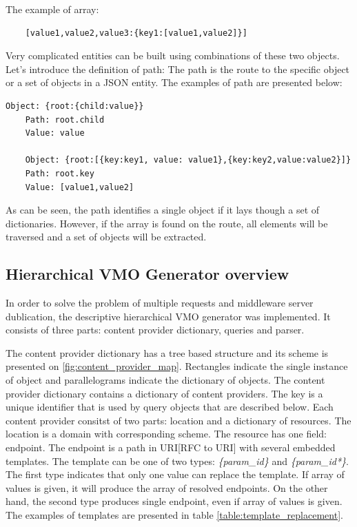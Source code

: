  
The example of array: 

\lstset{ %
    caption=The example of JSON array,
    basicstyle=\ttfamily\footnotesize\bfseries,
    linewidth=0.6\textwidth
 }
\begin{lstlisting}
	[value1,value2,value3:{key1:[value1,value2]}]
\end{lstlisting}

Very complicated entities can be built using combinations of these two objects. Let's introduce the definition of path: The path is the route to the specific object or a set of objects in a JSON entity. 
The examples of path are presented below:
\lstset{ %
    caption=The examples of objects in different routes,
    basicstyle=\ttfamily\footnotesize\bfseries,
    linewidth=0.6\textwidth
 }
\begin{lstlisting}[linewidth=5cm]
	Object: {root:{child:value}}
	Path: root.child
	Value: value

	Object: {root:[{key:key1, value: value1},{key:key2,value:value2}]}
	Path: root.key
	Value: [value1,value2]

\end{lstlisting}


As can be seen, the path identifies a single object if it lays though a set of dictionaries. However, if the array is found on the route, all elements will be traversed and a set of objects will be extracted. 


\subsection{Hierarchical VMO Generator overview}

In order to solve the problem of multiple requests and middleware server dublication, the descriptive hierarchical VMO generator was implemented. It consists of three parts: content provider dictionary, queries and parser. 

The content provider dictionary has a tree based structure and its scheme is presented on \ref{fig:content_provider_map}. Rectangles indicate the single instance of object and parallelograms indicate the dictionary of objects. The content provider dictionary contains a dictionary of content providers. The key is a unique identifier that is used by query objects that are described below. Each content provider consitst of two parts: location and a dictionary of resources. The location is a domain with corresponding scheme. The resource has one field: endpoint. The endpoint is a path in URI[RFC to URI] with several embedded templates. The template can be one of two types: \textit{\{param\_id\}} and \textit{\{param\_id*\}}. The first type indicates that only one value can replace the template. If array of values is given, it will produce the array of resolved endpoints. On the other hand, the second type produces single endpoint, even if array of values is given. The examples of templates are presented in table \ref{table:template_replacement}.

